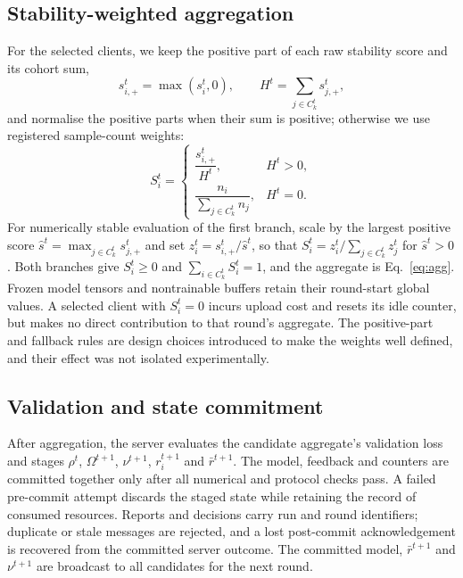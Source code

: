 \documentclass[pdflatex,sn-basic]{sn-jnl}
\begin{document}
\subsection{Stability-weighted aggregation}\label{sec4.7}
For the selected clients, we keep the positive part of each raw stability score and its cohort sum,
\begin{equation}\label{eq:splus}
s_{i,+}^t=\max(s_i^t,0),\qquad H^t=\sum_{j\in C_k^t}s_{j,+}^t,
\end{equation}
and normalise the positive parts when their sum is positive; otherwise we use registered sample-count weights:
\begin{equation}\label{eq:S}
S_i^t=\begin{cases}\dfrac{s_{i,+}^t}{H^t}, & H^t>0,\\[2ex] \dfrac{n_i}{\sum_{j\in C_k^t}n_j}, & H^t=0.\end{cases}
\end{equation}
For numerically stable evaluation of the first branch, scale by the largest positive score $\hat s^t=\max_{j\in C_k^t}s_{j,+}^t$ and set $z_i^t=s_{i,+}^t/\hat s^t$, so that $S_i^t=z_i^t/\sum_{j\in C_k^t}z_j^t$ for $\hat s^t>0$. Both branches give $S_i^t\ge 0$ and $\sum_{i\in C_k^t}S_i^t=1$, and the aggregate is Eq.~\eqref{eq:agg}. Frozen model tensors and nontrainable buffers retain their round-start global values. A selected client with $S_i^t=0$ incurs upload cost and resets its idle counter, but makes no direct contribution to that round's aggregate. The positive-part and fallback rules are design choices introduced to make the weights well defined, and their effect was not isolated experimentally.

\subsection{Validation and state commitment}\label{sec4.8}
After aggregation, the server evaluates the candidate aggregate's validation loss and stages $\rho^t$, $\Omega^{t+1}$, $\nu^{t+1}$, $r_i^{t+1}$ and $\bar r^{t+1}$. The model, feedback and counters are committed together only after all numerical and protocol checks pass. A failed pre-commit attempt discards the staged state while retaining the record of consumed resources. Reports and decisions carry run and round identifiers; duplicate or stale messages are rejected, and a lost post-commit acknowledgement is recovered from the committed server outcome. The committed model, $\bar r^{t+1}$ and $\nu^{t+1}$ are broadcast to all candidates for the next round.
\end{document}
